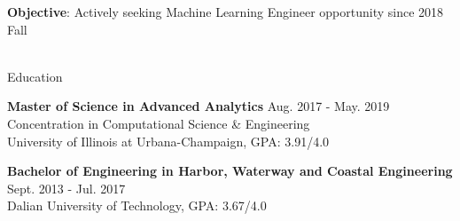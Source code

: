 \documentclass{resume} %
\begin{document}
\textbf{Objective}: Actively seeking Machine Learning Engineer opportunity since 2018 Fall\\
\\
\begin{rSection}{Education}



{\bf Master of Science in Advanced Analytics} \hfill {Aug. 2017 - May. 2019}
\\ 
Concentration in Computational Science \& Engineering
\\
University of Illinois at Urbana-Champaign, GPA: 3.91/4.0


{\bf Bachelor of Engineering in Harbor, Waterway and Coastal Engineering} \hfill {Sept. 2013 - Jul. 2017}
\\ 
Dalian University of Technology, GPA: 3.67/4.0



\end{rSection}
\end{document}
